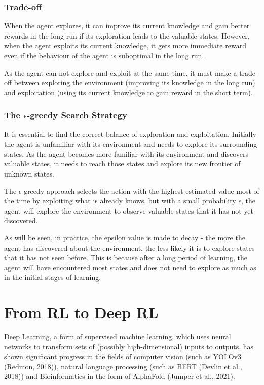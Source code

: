 \documentclass{article}
\begin{document}
\subsubsection{Trade-off}

When the agent explores, it can improve its current knowledge and gain better rewards in the long run if its exploration leads to the valuable states. However, when the agent exploits its current knowledge, it gets more immediate reward even if the behaviour of the agent is suboptimal in the long run. 

As the agent can not explore and exploit at the same time, it must make a trade-off between exploring the environment (improving its knowledge in the long run) and exploitation (using its current knowledge to gain reward in the short term). 

\subsubsection{The $\epsilon$-greedy Search Strategy}

It is essential to find the correct balance of exploration and exploitation. Initially the agent is unfamiliar with its environment and needs to explore its surrounding states. As the agent becomes more familiar with its environment and discovers valuable states, it needs to reach those states and explore its new frontier of unknown states. 

The $\epsilon$-greedy approach selects the action with the highest estimated value most of the time by exploiting what is already knows, but with a small probability $\epsilon$, the agent will explore the environment to observe valuable states that it has not yet discovered. 

As will be seen, in practice, the epsilon value is made to decay - the more the agent has discovered about the environment, the less likely it is to explore states that it has not seen before. This is because after a long period of learning, the agent will have encountered most states and does not need to explore as much as in the initial stages of learning.

\newpage


\section{From RL to Deep RL}

Deep Learning, a form of supervised machine learning, which uses neural networks to transform sets of (possibly high-dimensional) inputs to outputs, has shown significant progress in the fields of computer vision (such as YOLOv3 (Redmon, 2018)), natural language processing (such as BERT (Devlin et al., 2018)) and Bioinformatics in the form of AlphaFold (Jumper et al., 2021). 
\end{document}
